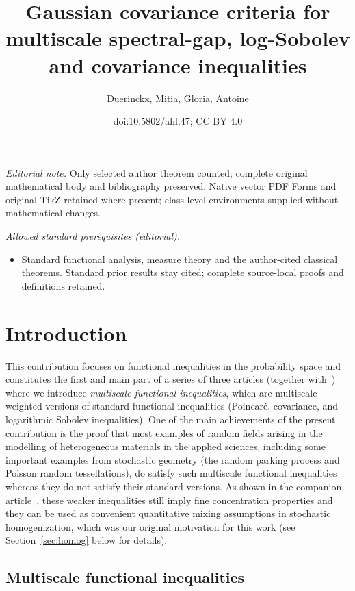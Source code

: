 \documentclass[10pt]{amsart}
\title{Gaussian covariance criteria for multiscale spectral-gap, log-Sobolev and covariance inequalities}
\author{Duerinckx, Mitia, Gloria, Antoine}
\date{doi:10.5802/ahl.47; CC BY 4.0}
\theoremstyle{definition}\newtheorem{defi}[theo]{Definition}\newtheorem{rema}[theo]{Remark}\newtheorem{exam}[theo]{Example}\newtheorem{exem}[theo]{Example}\newtheorem{nota}[theo]{Notation}
\begin{document}
\maketitle
\noindent\textit{Editorial note.} Only selected author theorem counted; complete original mathematical body and bibliography preserved. Native vector PDF Forms and original TikZ retained where present; class-level environments supplied without mathematical changes.\par\medskip
\noindent\textit{Allowed standard prerequisites (editorial).}\begin{itemize}
\item Standard functional analysis, measure theory and the author-cited classical theorems. Standard prior results stay cited; complete source-local proofs and definitions retained.
\end{itemize}\medskip

\section{Introduction}

This contribution focuses on functional inequalities in the probability space and constitutes the first and main part of a series of three articles (together with~\cite{DG1,DG3}) where we introduce \emph{multiscale functional inequalities}, which are multiscale weighted versions of standard functional inequalities (Poincaré, covariance, and logarithmic Sobolev inequalities). One of the main achievements of the present contribution is the proof that most examples of random fields arising in the modelling of heterogeneous materials in the applied sciences, including some important examples from stochastic geometry (the random parking process and Poisson random tessellations), do satisfy such multiscale functional inequalities whereas they do not satisfy their standard versions. As shown in the companion article~\cite{DG1}, these weaker inequalities still imply fine concentration properties and they can be used as convenient quantitative mixing assumptions in stochastic homogenization, which was our original motivation for this work (see Section~\ref{sec:homog} below for details).



\subsection{Multiscale functional inequalities}
\end{document}
